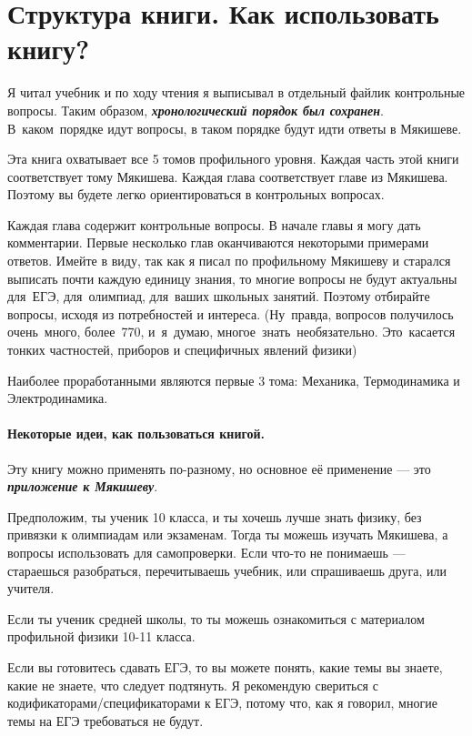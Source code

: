 \documentclass[12pt,a4paper]{report}
\begin{document}
\section{Структура книги. Как использовать книгу?}

Я читал учебник и по ходу чтения я выписывал в отдельный файлик контрольные вопросы. Таким образом, \textbf{\textsl{хронологический порядок был сохранен}}. В~каком~порядке идут вопросы, в таком порядке будут идти ответы в Мякишеве.

Эта книга охватывает все 5 томов профильного уровня. Каждая часть этой книги соответствует тому Мякишева. Каждая глава соответствует главе из Мякишева. Поэтому вы будете легко ориентироваться в контрольных вопросах.

Каждая глава содержит контрольные вопросы. В начале главы я могу дать комментарии. Первые несколько глав оканчиваются некоторыми примерами ответов. Имейте в виду, так как я писал по профильному Мякишеву и старался выписать почти каждую единицу знания, то многие вопросы не будут актуальны для~ЕГЭ, для~олимпиад, для~ваших школьных занятий. Поэтому отбирайте вопросы, исходя из потребностей и интереса. (Ну~правда, вопросов получилось очень~много, более~770, и~я~думаю, многое~знать~необязательно. Это~касается тонких частностей, приборов и специфичных явлений физики)

Наиболее проработанными являются первые 3 тома: Механика, Термодинамика и Электродинамика. 

\paragraph{Некоторые идеи, как пользоваться книгой.}
Эту книгу можно применять по-разному, но основное её применение --- это \textbf{\textsl{приложение к Мякишеву}}.

Предположим, ты ученик 10 класса, и ты хочешь лучше знать физику, без привязки к олимпиадам или экзаменам. Тогда ты можешь изучать Мякишева, а вопросы использовать для самопроверки. Если что-то не понимаешь --- стараешься разобраться, перечитываешь учебник, или спрашиваешь друга, или учителя.

Если ты ученик средней школы, то ты можешь ознакомиться с материалом профильной физики 10-11 класса.

Если вы готовитесь сдавать ЕГЭ, то вы можете понять, какие темы вы знаете, какие не знаете, что следует подтянуть. Я рекомендую свериться с кодификаторами/спецификаторами к ЕГЭ, потому что, как я говорил, многие темы на ЕГЭ требоваться не будут.
\end{document}
